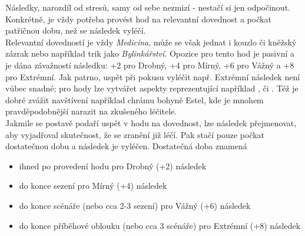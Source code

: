 Následky, narozdíl od stresů, samy od sebe nezmizí - nestačí si jen odpočinout. Konkrétně, je vždy potřeba provést hod na relevantní dovednost a počkat patřičnou dobu, než se následek vyléčí.\\
Relevantní dovedností je vždy \textit{Medicína}, může se však jednat i kouzlo či kněžský zázrak nebo například trik jako \textit{Bylinkářství}. Opozice pro tento hod je pasivní a je dána závažností následku: +2 pro Drobný, +4 pro Mírný, +6 pro Vážný a +8 pro Extrémní. Jak patrno, uspět při pokusu vyléčit např. Extrémní následek není vůbec snadné; pro hody lze vytvářet aspekty reprezentující například ,  či . Též je dobré zvážit navštívení například chrámu bohyně Estel, kde je mnohem pravděpodobnější narazit na zkušeného léčitele.\\
Jakmile se postavě podaří uspět v hodu na dovednost, lze následek přejmenovat, aby vyjadřoval skutečnost, že se zranění již léčí. Pak stačí pouze počkat dostatečnou dobu a následek je vyléčen. Dostatečná doba znamená

\begin{itemize}
\item ihned po provedení hodu pro Drobný (+2) následek
\item do konce sezení pro Mírný (+4) následek
\item do konce scénáře (nebo cca 2-3 sezení) pro Vážný (+6) následek
\item do konce příběhové oblouku (nebo cca 3 scénáře) pro Extrémní (+8) následek
\end{itemize}





